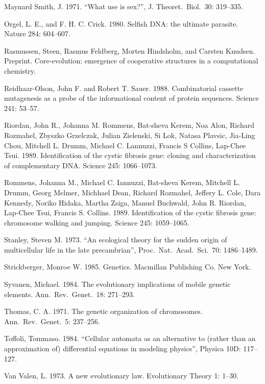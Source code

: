 Maynard Smith, J.  1971.  ``What use is sex?'',  J. Theoret.\ Biol.\ 30:
319--335.

Orgel, L. E., and F. H. C. Crick.  1980.  Selfish DNA: the ultimate parasite.
Nature 284: 604--607.

Rasmussen, Steen, Rasmus Feldberg, Morten Hindsholm, and Carsten Knudsen.
Preprint.  Core-evolution: emergence of cooperative structures in a
computational chemistry.

Reidhaar-Olson, John F. and Robert T. Sauer.  1988.  Combinatorial cassette
mutagenesis as a probe of the informational content of protein sequences.
Science 241: 53--57.

Riordan, John R., Johanna M. Rommens, Bat-sheva Kerem, Noa Alon, Richard
Rozmahel, Zbyszko Grzelczak, Julian Zielenski, Si Lok, Natasa Plavsic,
Jia-Ling Chou, Mitchell L. Drumm, Michael C. Lannuzzi, Francis S Collins,
Lap-Chee Tsui.  1989.  Identification of the cystic fibrosis gene: cloning
and characterization of complementary DNA.  Science 245: 1066--1073.

Rommens, Johanna M., Michael C. Iannuzzi, Bat-sheva Kerem, Mitchell L. Drumm,
Georg Melmer, Michhael Dean, Richard Rozmahel, Jeffery L. Cole, Dara Kennedy,
Noriko Hidaka, Martha Zsiga, Manuel Buchwald, John R. Riordan, Lap-Chee Tsui,
Francis S. Collins.  1989.  Identification of the cystic fibrosis gene:
chromosome walking and jumping.  Science 245: 1059--1065.

Stanley, Steven M.  1973.  ``An ecological theory for the sudden origin
of multicellular life in the late precambrian'', Proc.\ Nat.\ Acad.\ Sci.\ 70:
1486--1489.

Strickberger, Monroe W.  1985.  Genetics.  Macmillan Publishing Co.  New
York.

Syvanen, Michael.  1984.  The evolutionary implications of mobile
genetic elements.  Ann.\ Rev.\ Genet.\ 18: 271--293.

Thomas, C. A.  1971.  The genetic organization of chromosomes.
Ann.\ Rev.\ Genet.\ 5: 237--256.

Toffoli, Tommaso.  1984.  ``Cellular automata as an alternative to (rather
than an approximation of) differential equations in modeling physics'',
Physica 10D: 117--127.

Van Valen, L.  1973.  A new evolutionary law.  Evolutionary Theory 1: 1--30.
\eXP

